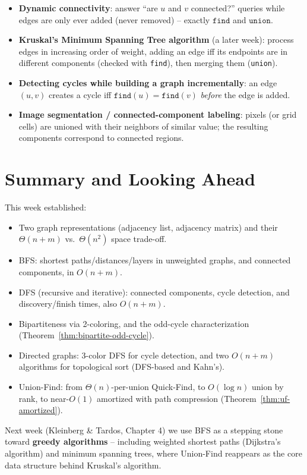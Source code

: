 \documentclass[11pt]{article}
\begin{document}
\begin{itemize}
    \item \textbf{Dynamic connectivity}: answer ``are $u$ and $v$ connected?'' queries
    while edges are only ever added (never removed) -- exactly $\texttt{find}$ and
    $\texttt{union}$.
    \item \textbf{Kruskal's Minimum Spanning Tree algorithm} (a later week): process edges
    in increasing order of weight, adding an edge iff its endpoints are in different
    components (checked with \texttt{find}), then merging them (\texttt{union}).
    \item \textbf{Detecting cycles while building a graph incrementally}: an edge $(u,v)$
    creates a cycle iff $\texttt{find}(u) = \texttt{find}(v)$ \emph{before} the edge is
    added.
    \item \textbf{Image segmentation / connected-component labeling}: pixels (or grid
    cells) are unioned with their neighbors of similar value; the resulting components
    correspond to connected regions.
\end{itemize}

\section{Summary and Looking Ahead}

This week established:
\begin{itemize}
    \item Two graph representations (adjacency list, adjacency matrix) and their
    $\Theta(n+m)$ vs.\ $\Theta(n^2)$ space trade-off.
    \item BFS: shortest paths/distances/layers in unweighted graphs, and connected
    components, in $O(n+m)$.
    \item DFS (recursive and iterative): connected components, cycle detection, and
    discovery/finish times, also $O(n+m)$.
    \item Bipartiteness via 2-coloring, and the odd-cycle characterization
    (Theorem~\ref{thm:bipartite-odd-cycle}).
    \item Directed graphs: 3-color DFS for cycle detection, and two $O(n+m)$ algorithms
    for topological sort (DFS-based and Kahn's).
    \item Union-Find: from $\Theta(n)$-per-union Quick-Find, to $O(\log n)$ union by rank,
    to near-$O(1)$ amortized with path compression (Theorem~\ref{thm:uf-amortized}).
\end{itemize}

Next week (Kleinberg \& Tardos, Chapter 4) we use BFS as a stepping stone toward
\textbf{greedy algorithms} -- including weighted shortest paths (Dijkstra's algorithm) and
minimum spanning trees, where Union-Find reappears as the core data structure behind
Kruskal's algorithm.
\end{document}
